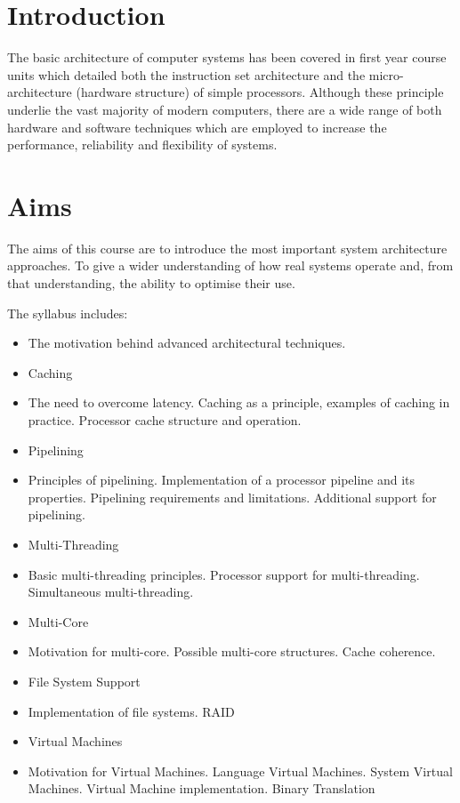 \section*{Introduction}

The basic architecture of computer systems has been covered in first year course
units which detailed both the instruction set architecture and the micro-
architecture (hardware structure) of simple processors. Although these principle
underlie the vast majority of modern computers, there are a wide range of both
hardware and software techniques which are employed to increase the performance,
reliability and flexibility of systems.

\section*{Aims}

The aims of this course are to introduce the most important system architecture
approaches. To give a wider understanding of how real systems operate and, from
that understanding, the ability to optimise their use.

The syllabus includes:

\begin{itemize}
	\item The motivation behind advanced architectural techniques.
	\item Caching
	\item The need to overcome latency. Caching as a principle, examples of caching in practice. Processor cache structure and operation.
	\item Pipelining
	\item Principles of pipelining. Implementation of a processor pipeline and its properties. Pipelining requirements and limitations. Additional support for pipelining.
	\item Multi-Threading
	\item Basic multi-threading principles. Processor support for multi-threading. Simultaneous multi-threading.
	\item Multi-Core
	\item Motivation for multi-core. Possible multi-core structures. Cache coherence.
	\item File System Support
	\item Implementation of file systems. RAID
	\item Virtual Machines
	\item Motivation for Virtual Machines. Language Virtual Machines. System Virtual Machines. Virtual Machine implementation. Binary Translation
\end{itemize}
